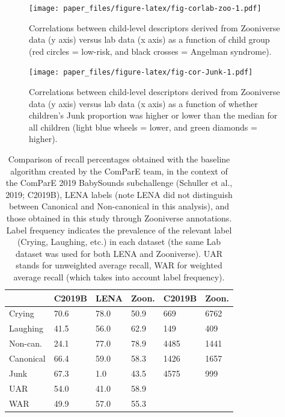 \documentclass[english,,man]{apa6}
\begin{document}
\begin{figure}
\centering
\texttt{[image: paper\_files/figure-latex/fig-corlab-zoo-1.pdf]}
\caption{\label{fig:fig-corlab-zoo}Correlations between child-level descriptors derived from Zooniverse data (y axis) versus lab data (x axis) as a function of child group (red circles = low-risk, and black crosses = Angelman syndrome).}
\end{figure}

\begin{figure}
\centering
\texttt{[image: paper\_files/figure-latex/fig-cor-Junk-1.pdf]}
\caption{\label{fig:fig-cor-Junk}Correlations between child-level descriptors derived from Zooniverse data (y axis) versus lab data (x axis) as a function of whether children's Junk proportion was higher or lower than the median for all children (light blue wheels = lower, and green diamonds = higher).}
\end{figure}

\begin{table}

\caption{\label{tab:tab-LENA-challenge}Comparison of recall percentages obtained with the baseline algorithm created by the ComParE team, in the context of the ComParE 2019 BabySounds subchallenge (Schuller et al., 2019; C2019B), LENA labels (note LENA did not distinguish between Canonical and Non-canonical in this analysis), and those obtained in this study through Zooniverse annotations. Label frequency indicates the prevalence of the relevant label (Crying, Laughing, etc.) in each dataset (the same Lab dataset was used for both LENA and Zooniverse). UAR stands for unweighted average recall, WAR for weighted average recall (which takes into account label frequency).}
\centering
\begin{tabular}[t]{l|l|l|l|l|l}
\hline
 & C2019B & LENA & Zoon. & C2019B & Zoon.\\
\hline
Crying & 70.6 & 78.0 & 50.9 & 669 & 6762\\
\hline
Laughing & 41.5 & 56.0 & 62.9 & 149 & 409\\
\hline
Non-can. & 24.1 & 77.0 & 78.9 & 4485 & 1441\\
\hline
Canonical & 66.4 & 59.0 & 58.3 & 1426 & 1657\\
\hline
Junk & 67.3 & 1.0 & 43.5 & 4575 & 999\\
\hline
UAR & 54.0 & 41.0 & 58.9 &  & \\
\hline
WAR & 49.9 & 57.0 & 55.3 &  & \\
\hline
\end{tabular}
\end{table}
\end{document}
